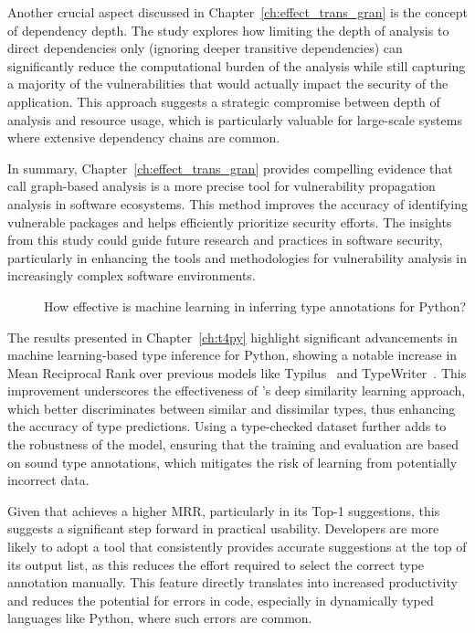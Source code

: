 Another crucial aspect discussed in Chapter~\ref{ch:effect_trans_gran} is the concept of dependency depth. The study explores how limiting the depth of analysis to direct dependencies only (ignoring deeper transitive dependencies) can significantly reduce the computational burden of the analysis while still capturing a majority of the vulnerabilities that would actually impact the security of the application. This approach suggests a strategic compromise between depth of analysis and resource usage, which is particularly valuable for large-scale systems where extensive dependency chains are common.

In summary, Chapter~\ref{ch:effect_trans_gran} provides compelling evidence that call graph-based analysis is a more precise tool for vulnerability propagation analysis in software ecosystems. This method improves the accuracy of identifying vulnerable packages and helps efficiently prioritize security efforts. The insights from this study could guide future research and practices in software security, particularly in enhancing the tools and methodologies for vulnerability analysis in increasingly complex software environments.

\begin{description}
\item[] How effective is machine learning in inferring type annotations for Python?
\end{description}

The results presented in Chapter~\ref{ch:t4py} highlight significant advancements in machine learning-based type inference for Python, showing a notable increase in Mean Reciprocal Rank over previous models like Typilus~\cite{allamanis2020typilus} and TypeWriter~\cite{pradel2019typewriter}. This improvement underscores the effectiveness of 's deep similarity learning approach, which better discriminates between similar and dissimilar types, thus enhancing the accuracy of type predictions. Using a type-checked dataset further adds to the robustness of the model, ensuring that the training and evaluation are based on sound type annotations, which mitigates the risk of learning from potentially incorrect data.

Given that  achieves a higher MRR, particularly in its Top-1 suggestions, this suggests a significant step forward in practical usability. Developers are more likely to adopt a tool that consistently provides accurate suggestions at the top of its output list, as this reduces the effort required to select the correct type annotation manually. This feature directly translates into increased productivity and reduces the potential for errors in code, especially in dynamically typed languages like Python, where such errors are common.

